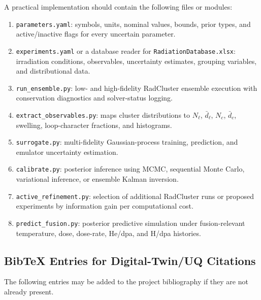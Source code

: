 A practical implementation should contain the following files or modules:
\begin{enumerate}
    \item \texttt{parameters.yaml}: symbols, units, nominal values, bounds,
    prior types, and active/inactive flags for every uncertain parameter.
    \item \texttt{experiments.yaml} or a database reader for
    \texttt{RadiationDatabase.xlsx}: irradiation conditions, observables,
    uncertainty estimates, grouping variables, and distributional data.
    \item \texttt{run\_ensemble.py}: low- and high-fidelity RadCluster ensemble
    execution with conservation diagnostics and solver-status logging.
    \item \texttt{extract\_observables.py}: maps cluster distributions to
    $N_\ell$, $\bar d_\ell$, $N_c$, $\bar d_c$, swelling, loop-character
    fractions, and histograms.
    \item \texttt{surrogate.py}: multi-fidelity Gaussian-process training,
    prediction, and emulator uncertainty estimation.
    \item \texttt{calibrate.py}: posterior inference using MCMC, sequential
    Monte Carlo, variational inference, or ensemble Kalman inversion.
    \item \texttt{active\_refinement.py}: selection of additional RadCluster
    runs or proposed experiments by information gain per computational cost.
    \item \texttt{predict\_fusion.py}: posterior predictive simulation under
    fusion-relevant temperature, dose, dose-rate, He/dpa, and H/dpa histories.
\end{enumerate}

\subsection{BibTeX Entries for Digital-Twin/UQ Citations}
\label{app:dt_bibtex_entries}

The following entries may be added to the project bibliography if they are not
already present.

